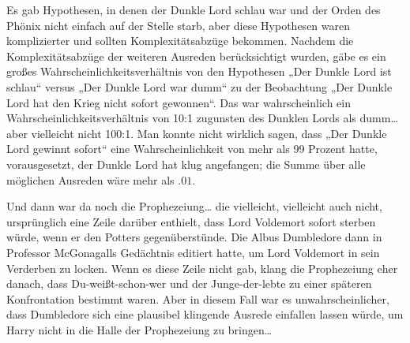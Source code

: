 Es gab Hypothesen, in denen der Dunkle Lord schlau war und der Orden des Phönix nicht einfach auf der Stelle starb, aber diese Hypothesen waren komplizierter und sollten Komplexitätsabzüge bekommen. Nachdem die Komplexitätsabzüge der weiteren Ausreden berücksichtigt wurden, gäbe es ein großes Wahrscheinlichkeitsverhältnis von den Hypothesen „Der Dunkle Lord ist schlau“ versus „Der Dunkle Lord war dumm“ zu der Beobachtung „Der Dunkle Lord hat den Krieg nicht sofort gewonnen“. Das war wahrscheinlich ein Wahrscheinlichkeitsverhältnis von 10:1 zugunsten des Dunklen Lords als dumm… aber vielleicht nicht 100:1. Man konnte nicht wirklich sagen, dass „Der Dunkle Lord gewinnt sofort“ eine Wahrscheinlichkeit von mehr als 99 Prozent hatte, vorausgesetzt, der Dunkle Lord hat klug angefangen; die Summe über alle möglichen Ausreden wäre mehr als $.01$.


Und dann war da noch die Prophezeiung… die vielleicht, vielleicht auch nicht, ursprünglich eine Zeile darüber enthielt, dass Lord Voldemort sofort sterben würde, wenn er den Potters gegenüberstünde. Die Albus Dumbledore dann in Professor McGonagalls Gedächtnis editiert hatte, um Lord Voldemort in sein Verderben zu locken. Wenn es diese Zeile nicht gab, klang die Prophezeiung eher danach, dass Du-weißt-schon-wer und der Junge-der-lebte zu einer späteren Konfrontation bestimmt waren. Aber in diesem Fall war es unwahrscheinlicher, dass Dumbledore sich eine plausibel klingende Ausrede einfallen lassen würde, um Harry nicht in die Halle der Prophezeiung zu bringen…

